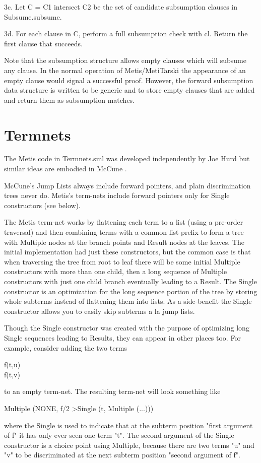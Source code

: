 \documentclass[11pt, oneside]{article}   	%
\begin{document}
3c. Let C = C1 intersect C2 be the set of candidate subsumption
clauses in Subsume.subsume.

3d. For each clause in C, perform a full subsumption check with cl.
Return the first clause that succeeds.

Note that the subsumption structure allows empty clauses which will
subsume any clause.
In the normal operation of Metis/MetiTarski the appearance
of an empty clause would signal a successful proof. However, 
the forward subsumption data structure is written to be generic and
to store empty clauses that are added and return them
as subsumption matches. 

\section{Termnets}

The Metis code in Termnets.sml was developed independently by Joe Hurd but
similar ideas are embodied in McCune \cite{McCune90}.

McCune's Jump Lists always
include forward pointers, and plain discrimination trees never do. Metis's
term-nets include forward pointers only for Single constructors (see
below).

The Metis term-net works by flattening each term to a list (using a
pre-order traversal) and then combining terms with a common list
prefix to form a tree with Multiple nodes at the branch points and
Result nodes at the leaves. The initial implementation had just these
constructors, but the common case is that when traversing the tree
from root to leaf there will be some initial Multiple constructors
with more than one child, then a long sequence of Multiple
constructors with just one child branch eventually leading to a
Result. The Single constructor is an optimization for the long
sequence portion of the tree by storing whole subterms instead of
flattening them into lists. As a side-benefit the Single constructor
allows you to easily skip subterms a la jump lists.

Though the Single constructor was created with the purpose of
optimizing long Single sequences leading to Results, they can appear
in other places too. For example, consider adding the two terms
\begin{description}
\item[f(t,u)]
\item[f(t,v)]
\end{description}

to an empty term-net. The resulting term-net will look something like
\begin{description}
\item[Multiple (NONE, f/2 \textbar \textendash \textgreater Single (t, Multiple (...)))]
\end{description}
where the Single is used to indicate that at the subterm position
"first argument of f" it has only ever seen one term "t". The second
argument of the Single constructor is a choice point using Multiple,
because there are two terms "u" and "v" to be discriminated at the
next subterm position "second argument of f".

{}

\end{document}
